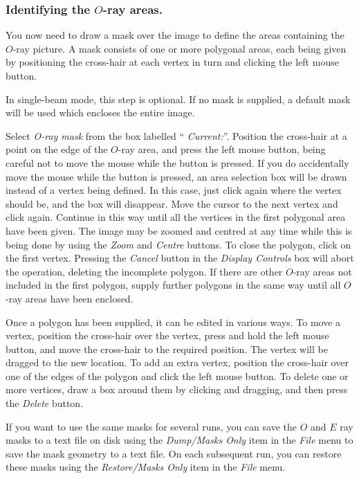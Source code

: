 \documentclass[11pt]{article}
\newcommand{\htmlref}[2]{#1}
\newcommand{\xlabel}[1]{}
\newcommand{\mylabel}[1] {\xlabel{#1}\label{#1}}
\begin{document}
\subsubsection {\mylabel{TUT_O_RAY_AREAS}Identifying the $O$-ray areas.}
You now need to draw a mask over the image to define the areas containing
the $O$-ray picture. A mask consists of one or more polygonal areas, each
being given by positioning the cross-hair at each vertex in turn and
clicking the left mouse button.

In single-beam mode, this step is optional. If no mask is supplied, a
default mask will be used which encloses the entire image.

Select \emph{O-ray mask} from the box labelled ``\htmlref{{\em
Current:}}{POLKA_CURRENT}''. Position the cross-hair at a point on the
edge of the $O$-ray area, and press the left mouse button, being careful
not to move the mouse while the button is pressed. If you do accidentally
move the mouse while the button is pressed, an area selection box will be
drawn instead of a vertex being defined. In this case, just click again
where the vertex should be, and the box will disappear. Move the cursor
to the next vertex and click again. Continue in this way until all the
vertices in the first polygonal area have been given. The image may be
zoomed and centred at any time while this is being done by using the
\htmlref{\emph{Zoom}}{POLKA_ZOOM} and \htmlref{\emph{Centre}}{POLKA_CENTRE}
buttons. To close the polygon, click on the first vertex. Pressing the
\htmlref{\emph{Cancel}}{POLKA_CANCEL} button in the \htmlref{\emph{Display
Controls}}{POLKA_DISPLAY_CONTROLS} box will abort the operation,
deleting the incomplete polygon. If there are other $O$-ray areas not
included in the first polygon, supply further polygons in the same way
until all $O$-ray areas have been enclosed.

Once a polygon has been supplied, it can be edited in various ways. To
move a vertex, position the cross-hair over the vertex, press and hold
the left mouse button, and move the cross-hair to the required position.
The vertex will be dragged to the new location. To add an extra vertex,
position the cross-hair over one of the edges of the polygon and click
the left mouse button. To delete one or more vertices, draw a box around
them by clicking and dragging, and then press the \htmlref{{\em
Delete}}{POLKA_DELETE} button.

If you want to use the same masks for several runs, you can save the $O$
and $E$ ray masks to a text file on disk using the
\htmlref{\emph{Dump/Masks Only}}{POLKA_DUMP} item in the
\htmlref{\emph{File}}{POLKA_FILE_MENU} menu to save the mask geometry to
a text file. On each subsequent run, you can restore these masks using the
\htmlref{\emph{Restore/Masks Only}}{POLKA_RESTORE} item in the \htmlref{\emph{File}}{POLKA_FILE_MENU}
menu.
\end{document}
